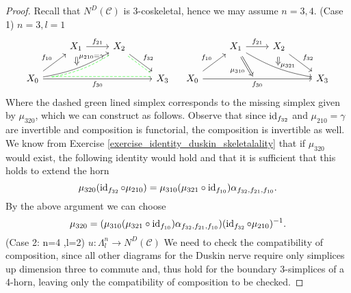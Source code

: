 \begin{proof}
	Recall that $ N^D ( \mathcal{ C } ) $ is 3-coskeletal, hence we may assume $ n = 3 , 4 $.
	(Case 1) $ n = 3 , l = 1 $ 
	\[
	\begin{tikzcd}
		&
		X_1
		\ar[r , " f_{ 2 1 } " ]
		&
		X_2
		\ar[rd, "f_{ 3 2 } "]
		\ar[rd, green, dash, dashed, shift right]
		\\
		X_0
		\ar[rrr, green, dash, dashed, shift left,
			start anchor={[xshift=2ex]}]
		\ar[rru,bend right=10,""{name=U, below}]
		\ar[rru, green, dash, dashed, shift right, bend right=10, 
		start anchor={[xshift=2ex]},
		start anchor={[yshift=0.5ex]}]
		\ar[ru, " f_{ 1 0 } " ]
		\ar[rrr, " f_{ 3 0 } "']
		\arrow[Rightarrow, from=ru, to=U, shorten=3, "\mu_{ 2 1 0 } = \gamma"]
		&&&
		X_3
	\end{tikzcd}
	\quad
	\begin{tikzcd}
		&
		X_1
		\ar[r , " f_{ 2 1 } " ]
		\ar[rrd, bend right=10,""{name=D, below}]
		&
		X_2
		\ar[rd, "f_{ 3 2 } "]
		\ar[Rightarrow, to=D, shorten = 3, "\mu_{ 3 2 1 } "]
		\\
		X_0
		\ar[ru, " f_{ 1 0 } " ]
		\ar[rrr, " f_{ 3 0 } "' {name=L, below}]
		\ar[Rightarrow, from=ur, to=L, shorten = 3, "\mu_{ 3 1 0 } "']
		&&&
		X_3
	\end{tikzcd}
	\]
	Where the dashed green lined simplex corresponds to the missing simplex given by $ \mu_{ 3 2 0 } $, which we can construct as follows.
	Observe that since $ \operatorname{id}_{ f_ { 3 2 } } $ and $ \mu_{ 2 1 0 } = \gamma $ are invertible and composition is functorial, the composition is invertible as well. 
	We know from Exercise \ref{exercise_identity_duskin_skeletalality} that if $ \mu_{ 3 2 0 } $ would exist, the following identity would hold and that it is sufficient that this holds to extend the horn
	\[
		\mu_{ 3 2 0 } ( \operatorname{id}_{ f_ { 3 2 } }  \circ \mu_{ 2 1 0 } ) 
		=
		\mu_{ 3 1 0 } ( \mu_{ 3 2 1 } \circ \operatorname{id}_{ f_{ 1 0 } } ) \alpha_{ f_{ 3 2 } , f_{ 2 1 } , f_{ 1 0 } } .
	\]
	By the above argument we can choose
	\[
		\mu_{ 3 2 0 } 
		=
		( \mu_{ 3 1 0 } ( \mu_{ 3 2 1 } \circ \operatorname{id}_{ f_{ 1 0 } } ) \alpha_{ f_{ 3 2 } , f_{ 2 1 } , f_{ 1 0 } } )  ( \operatorname{id}_{ f_ { 3 2 } } \circ \mu_{ 2 1 0 } )^{ - 1 }.
	\]
	\newline
	(Case 2: n=4 ,l=2) $ u \colon \Lambda_l^n \to N^D ( \mathcal{ C } ) $
	\newline
	We need to check the compatibility of composition, since all other diagrams for the Duskin nerve require only simplices up dimension three to commute and, thus hold for the boundary 3-simplices of a 4-horn, leaving only the compatibility of composition to be checked.

\end{proof}
